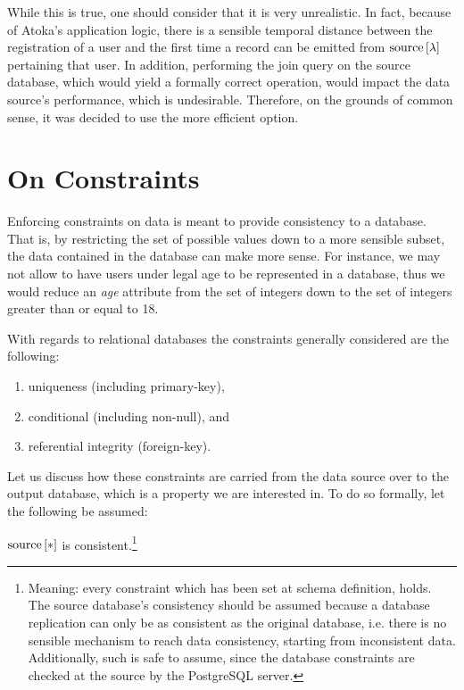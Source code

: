 While this is true, one should consider that it is very unrealistic.
In fact, because of Atoka's application logic, there is a sensible temporal distance between the registration of a user and the first time a record can be emitted from $\text{source}\left[{\lambda}\right]$ pertaining that user.
In addition, performing the join query on the source database, which would yield a formally correct operation, would impact the data source's performance, which is undesirable.
Therefore, on the grounds of common sense, it was decided to use the more efficient option.


\section{On Constraints}

Enforcing constraints on data is meant to provide consistency to a database.
That is, by restricting the set of possible values down to a more sensible subset, the data contained in the database can make more sense.
For instance, we may not allow to have users under legal age to be represented in a database, thus we would reduce an \emph{age} attribute from the set of integers down to the set of integers greater than or equal to 18.

With regards to relational databases the constraints generally considered are the following:

\begin{enumerate}
	\item uniqueness (including primary-key),
	\item conditional (including non-null), and
	\item referential integrity (foreign-key).
\end{enumerate}

Let us discuss how these constraints are carried from the data source over to the output database, which is a property we are interested in.
To do so formally, let the following be assumed:

\begin{axiom}\label{axiom:source-consistency}
	$\text{source}\left[{*}\right]$ is consistent.\footnote{%
		Meaning: every constraint which has been set at schema definition, holds.
		The source database's consistency should be assumed because a database replication can only be as consistent as the original database, i.e. there is no sensible mechanism to reach data consistency, starting from inconsistent data.
		Additionally, such is safe to assume, since the database constraints are checked at the source by the PostgreSQL server.
	}
\end{axiom}

